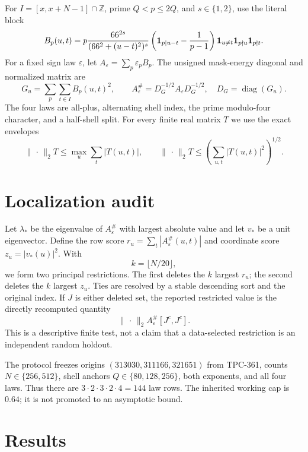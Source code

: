 \documentclass[10pt]{article}
\newcommand{\opnorm}{\lVert\,\cdot\,\rVert_2}
\begin{document}
For $I=[x,x+N-1]\cap\mathbb Z$, prime $Q<p\leq2Q$, and
$s\in\{1,2\}$, use the literal block
\begin{equation}
B_p(u,t)=p\frac{66^{2s}}{(66^2+(u-t)^2)^s}
\left({\bf1}_{p\mid u-t}-\frac1{p-1}\right)
{\bf1}_{u\ne t}{\bf1}_{p\nmid u}{\bf1}_{p\nmid t}.
\label{eq:block}
\end{equation}
For a fixed sign law $\varepsilon$, let
$A_\varepsilon=\sum_p\varepsilon_pB_p$.  The unsigned mask-energy diagonal
and normalized matrix are
\begin{equation}
G_u=\sum_p\sum_{t\in I}B_p(u,t)^2,
\qquad
A_\varepsilon^\#=D_G^{-1/2}A_\varepsilon D_G^{-1/2},
\quad D_G=\operatorname{diag}(G_u).
\label{eq:norm}
\end{equation}
The four laws are all-plus, alternating shell index, the prime modulo-four
character, and a half-shell split.  For every finite real matrix $T$ we use
the exact envelopes
\begin{equation}
\opnorm{T}\leq\max_u\sum_t|T(u,t)|,
\qquad
\opnorm{T}\leq\left(\sum_{u,t}|T(u,t)|^2\right)^{1/2}.
\label{eq:envelopes}
\end{equation}

\section{Localization audit}

Let $\lambda_*$ be the eigenvalue of $A_\varepsilon^\#$ with largest
absolute value and let $v_*$ be a unit eigenvector.  Define the row score
$r_u=\sum_t|A_\varepsilon^\#(u,t)|$ and coordinate score
$z_u=|v_*(u)|^2$.  With
\[
k=\lfloor N/20\rfloor,
\]
we form two principal restrictions.  The first deletes the $k$ largest
$r_u$; the second deletes the $k$ largest $z_u$.  Ties are resolved by a
stable descending sort and the original index.  If $J$ is either deleted
set, the reported restricted value is the directly recomputed quantity
\[
\opnorm{A_\varepsilon^\#[J^c,J^c]}.
\]
This is a descriptive finite test, not a claim that a data-selected
restriction is an independent random holdout.

The protocol freezes origins $(313030,311166,321651)$ from TPC-361, counts
$N\in\{256,512\}$, shell anchors $Q\in\{80,128,256\}$, both exponents, and
all four laws.  Thus there are
$3\cdot2\cdot3\cdot2\cdot4=144$ law rows.  The inherited working cap is
$0.64$; it is not promoted to an asymptotic bound.

\section{Results}
\end{document}
